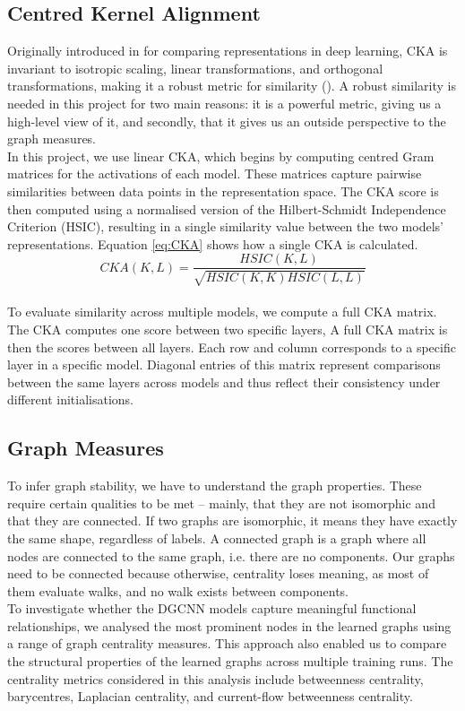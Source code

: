 \subsection{Centred Kernel Alignment }\label{CKA}
Originally introduced in \cite{Hinton} for comparing representations in deep learning, CKA is invariant to isotropic scaling, linear transformations, and orthogonal transformations, making it a robust metric for similarity (\cite{Hinton}). A robust similarity is needed in this project for two main reasons: it is a powerful metric, giving us a high-level view of it, and secondly, that it gives us an outside perspective to the graph measures.
\vspace{0.5em}\\
In this project, we use linear CKA, which begins by computing centred Gram matrices for the activations of each model. These matrices capture pairwise similarities between data points in the representation space. The CKA score is then computed using a normalised version of the Hilbert-Schmidt Independence Criterion (HSIC), resulting in a single similarity value between the two models’ representations. Equation \ref{eq:CKA} shows how a single CKA is calculated.
\begin{equation} \label{eq:CKA}
    CKA(K,L)=\frac{HSIC(K,L)}{\sqrt{HSIC(K,K)HSIC(L,L)}}
\end{equation}
\vspace{0.5em}\\
To evaluate similarity across multiple models, we compute a full CKA matrix. The CKA computes one score between two specific layers, A full CKA matrix is then the scores between all layers. Each row and column corresponds to a specific layer in a specific model. Diagonal entries of this matrix represent comparisons between the same layers across models and thus reflect their consistency under different initialisations.
\subsection{Graph Measures}
To infer graph stability, we have to understand the graph properties. These require certain qualities to be met – mainly, that they are not isomorphic and that they are connected. If two graphs are isomorphic, it means they have exactly the same shape, regardless of labels. A connected graph is a graph where all nodes are connected to the same graph, i.e. there are no components. Our graphs need to be connected because otherwise, centrality loses meaning, as most of them evaluate walks, and no walk exists between components. 
\vspace{0.5em}\\
To investigate whether the DGCNN models capture meaningful functional relationships, we analysed the most prominent nodes in the learned graphs using a range of graph centrality measures. This approach also enabled us to compare the structural properties of the learned graphs across multiple training runs. The centrality metrics considered in this analysis include betweenness centrality, barycentres, Laplacian centrality, and current-flow betweenness centrality.
